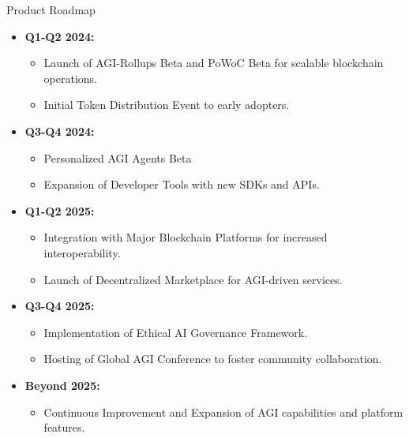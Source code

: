 \documentclass{beamer}
\begin{document}
\begin{frame}{Product Roadmap}
    \footnotesize %
    \begin{itemize}
        \item \textbf{Q1-Q2 2024:}
        \begin{itemize}
            \item Launch of AGI-Rollups Beta and PoWoC Beta for scalable blockchain operations.
            \item Initial Token Distribution Event to early adopters.
        \end{itemize}
        
        \item \textbf{Q3-Q4 2024:}
        \begin{itemize}
            \item Personalized AGI Agents Beta
            \item Expansion of Developer Tools with new SDKs and APIs.
        \end{itemize}
        
        \item \textbf{Q1-Q2 2025:}
        \begin{itemize}
            \item Integration with Major Blockchain Platforms for increased interoperability.
            \item Launch of Decentralized Marketplace for AGI-driven services.
        \end{itemize}
        
        \item \textbf{Q3-Q4 2025:}
        \begin{itemize}
            \item Implementation of Ethical AI Governance Framework.
            \item Hosting of Global AGI Conference to foster community collaboration.
        \end{itemize}
        
        \item \textbf{Beyond 2025:}
        \begin{itemize}
            \item Continuous Improvement and Expansion of AGI capabilities and platform features.
        \end{itemize}
    \end{itemize}
\end{frame}
\end{document}
